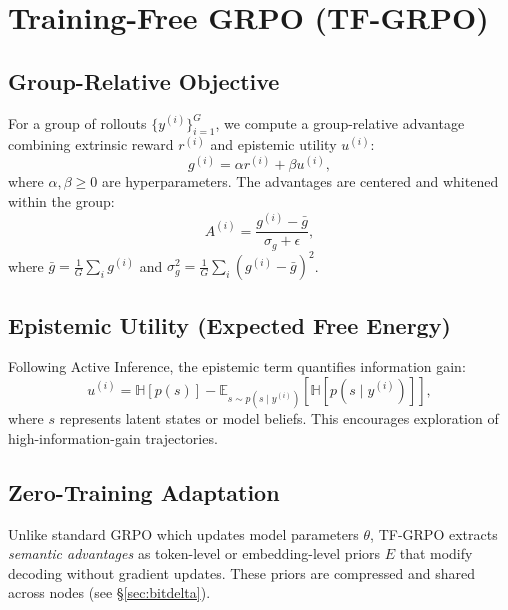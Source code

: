 \section{Training-Free GRPO (TF-GRPO)}
\subsection{Group-Relative Objective}
For a group of rollouts \(\{y^{(i)}\}_{i=1}^G\), we compute a group-relative advantage combining extrinsic reward \(r^{(i)}\) and epistemic utility \(u^{(i)}\):
\begin{equation}\label{eq:tf-grpo-objective}
g^{(i)} = \alpha r^{(i)} + \beta u^{(i)},
\end{equation}
where \(\alpha, \beta \ge 0\) are hyperparameters. The advantages are centered and whitened within the group:
\begin{equation}
A^{(i)} = \frac{g^{(i)} - \bar g}{\sigma_g + \epsilon},
\end{equation}
where \(\bar g = \frac{1}{G}\sum_i g^{(i)}\) and \(\sigma_g^2 = \frac{1}{G}\sum_i (g^{(i)} - \bar g)^2\).

\subsection{Epistemic Utility (Expected Free Energy)}
Following Active Inference, the epistemic term quantifies information gain:
\begin{equation}
u^{(i)} = \mathbb{H}[p(s)] - \mathbb{E}_{s\sim p(s\mid y^{(i)})}[\mathbb{H}[p(s\mid y^{(i)})]],
\end{equation}
where \(s\) represents latent states or model beliefs. This encourages exploration of high-information-gain trajectories.

\subsection{Zero-Training Adaptation}
Unlike standard GRPO which updates model parameters \(\theta\), TF-GRPO extracts \emph{semantic advantages} as token-level or embedding-level priors \(E\) that modify decoding without gradient updates. These priors are compressed and shared across nodes (see \S\ref{sec:bitdelta}).
